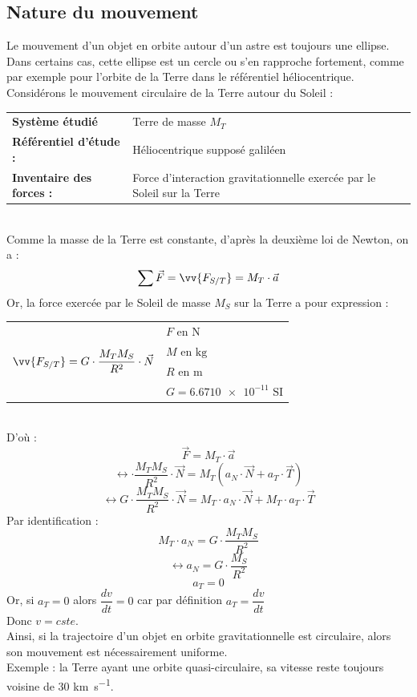\documentclass[a4paper,12pt,fleqn]{scrartcl}%
\begin{document}
	\subsection{Nature du mouvement}
	\begin{minipage}{.7\linewidth}
	Le mouvement d'un objet en orbite autour d'un astre est toujours une ellipse. Dans certains cas, cette ellipse est un cercle ou s'en rapproche fortement, comme par exemple pour l'orbite de la Terre dans le référentiel héliocentrique.\\
	Considérons le mouvement circulaire de la Terre autour du Soleil :\\ 
	\begin{tabular}{m{.4\linewidth} m{.5\linewidth}}
	\textbf{Système étudié} & Terre de masse $M_T$\\
	\textbf{Référentiel d'étude :} & Héliocentrique supposé galiléen\\
	\textbf{Inventaire des forces :} & Force d'interaction gravitationnelle exercée par le Soleil sur la Terre\\	
	\end{tabular}\\
	Comme la masse de la Terre est constante, d'après la deuxième loi de Newton, on a :
	\begin{eqnarray}
	\sum \vec{F} = \vv{F_{S/T}} = M_T \cdot \vec{a} \nonumber
	\end{eqnarray}
	Or, la force exercée par le Soleil de masse $M_S$ sur la Terre a pour expression :\\
	\begin{tabular}{m{4cm}|m{4cm}}
	\multirow{4}{4cm}{$\vv{F_{S/T}} = G \cdot \dfrac{M_T M_S}{R^2}\cdot \vec{N}$}
	&$F \text{ en } \unit{\newton}$\\
	&$M \text{ en } \unit{\kilo \gram}$\\
	&$R \text{ en } \unit{\meter}$\\
	&$G = \num{6,6710e-11} \text{ SI}$\\
	\end{tabular}\\
	D'où : 
	$$\vec{F} = M_T \cdot \vec{a} $$
	$$\leftrightarrow  \cdot \dfrac{M_T M_S}{R^2}\cdot \vec{N}  = M_T \left(a_N \cdot \vec{N} + a_T \cdot \vec{T} \right)$$
	$$\leftrightarrow  G \cdot \dfrac{M_T M_S}{R^2}\cdot \vec{N}  = M_T \cdot a_N \cdot \vec{N} + M_T \cdot a_T \cdot \vec{T}$$
	Par identification :$$M_T \cdot a_N = G \cdot \dfrac{M_T M_S}{R^2}$$
	$$\leftrightarrow a_N = G \cdot \dfrac{M_S}{R^2}$$
	$$ a_T = 0$$
	Or, si $a_T=0$ alors $\dfrac{dv}{dt}=0$ car par définition $a_T=\dfrac{dv}{dt}$\\
	Donc $v=cste$.\\
	Ainsi, si la trajectoire d'un objet en orbite gravitationnelle est circulaire, alors son mouvement est nécessairement uniforme.\\
	Exemple : la Terre ayant une orbite quasi-circulaire, sa vitesse reste toujours voisine de \num{30} \unit{\kilo \meter \per \second}.
	\end{minipage}
	
\end{document}
